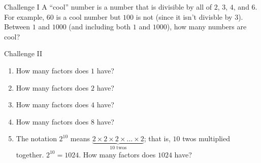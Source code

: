 \documentclass[12pt,letterpaper]{article}
\begin{document}
\begin{problem}{Challenge I}
 A ``cool'' number is a number that is divisible by all of $2$, $3$, $4$, and
 $6$. For example, $60$ is a cool number but $100$ is not (since it isn't
 divisble by $3$). Between $1$ and $1000$ (and including both $1$ and $1000$),
 how many numbers are cool?
\end{problem}

\begin{problem}{Challenge II}
 \begin{enumerate}
  \item How many factors does $1$ have?
  \item How many factors does $2$ have?
  \item How many factors does $4$ have?
  \item How many factors does $8$ have?
  \item The notation $2^{10}$ means $\underbrace{ 2\times2\times2\times
  \ldots\times2}_\text{$10$ twos}$; that is, $10$ twos multiplied together.
  $2^{10}=1024$. How many factors does $1024$ have?
 \end{enumerate}
\end{problem}
\end{document}
